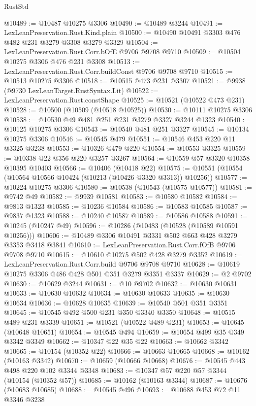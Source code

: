 \begin{lexlean}{RustStd}
\begin{coremodule}
@10489 := @10487 @10275 @3306
@10490 := @10489 @3244
@10491 := LexLeanPreservation.Rust.Kind.plain
@10500 := @10490 @10491 @3303 @476 @482 @231 @3279 @3308 @3279 @3329
@10504 := LexLeanPreservation.Rust.Corr.bOfE @9706 @9708 @9710
@10509 := @10504 @10275 @3306 @476 @231 @3308
@10513 := LexLeanPreservation.Rust.Corr.buildConst @9706 @9708 @9710
@10515 := @10513 @10275 @3306
@10518 := @10515 @473 @231 @3307
@10521 := @9938 (@9730 LexLeanTarget.RustSyntax.Lit)
@10522 := LexLeanPreservation.Rust.constShape
@10525 := @10521 (@10522 @473 @231)
@10528 := @10500 (@10509 (@10518 @10525))
@10530 := @10111 @10275 @3306
@10538 := @10530 @49 @481 @251 @231 @3279 @3327 @3244 @1323
@10540 := @10125 @10275 @3306
@10543 := @10540 @481 @251 @3327
@10545 := @10134 @10275 @3306
@10546 := @10545 @479
@10551 := @10546 @453 @220 @11 @3325 @3238
@10553 := @10326 @479 @220
@10554 := @10553 @3325
@10559 := @10338 @22 @356 @220 @3257 @3267
@10564 := @10559 @57 @3320 @10358 @10395 @10403
@10566 := @10406 (@10418 @22)
@10575 := @10551 (@10554 (@10564 @10566 @10424 (@10213 (@10426 @3320 @3313)) @10256))
@10577 := @10224 @10275 @3306
@10580 := @10538 (@10543 (@10575 @10577))
@10581 := @9742 @49
@10582 := @9939 @10581
@10583 := @10580 @10582
@10584 := @9813 @1323
@10585 := @10236 @10584
@10586 := @10583 @10585
@10587 := @9837 @1323
@10588 := @10240 @10587
@10589 := @10586 @10588
@10591 := @10245 (@10247 @49)
@10596 := @10286 (@10483 (@10528 (@10589 @10591 @10256)))
@10606 := @10489 @3306 @10491 @3331 @502 @663 @428 @3279 @3353 @3418 @3841
@10610 := LexLeanPreservation.Rust.Corr.fOfB @9706 @9708 @9710
@10615 := @10610 @10275 @502 @428 @3279 @3352
@10619 := LexLeanPreservation.Rust.Corr.build @9706 @9708 @9710
@10628 := @10619 @10275 @3306 @486 @428 @501 @351 @3279 @3351 @3337
@10629 := @2 @9702
@10630 := @10629 @3244
@10631 := @10 @9702
@10632 := @10630 @10631
@10633 := @10630 @10632
@10634 := @10630 @10633
@10635 := @10630 @10634
@10636 := @10628 @10635
@10639 := @10540 @501 @351 @3351
@10645 := @10545 @492 @500 @231 @350 @3340 @3350
@10648 := @10515 @489 @231 @3339
@10651 := @10521 (@10522 @489 @231)
@10653 := @10645 (@10648 @10651)
@10654 := @10545 @494
@10659 := @10654 @499 @35 @349 @3342 @3349
@10662 := @10347 @22 @35 @22
@10663 := @10662 @3342
@10665 := @10154 (@10352 @22)
@10666 := @10663 @10665
@10668 := @10162 (@10163 @3342)
@10670 := @10659 (@10666 @10668)
@10676 := @10545 @443 @498 @220 @102 @3344 @3348
@10683 := @10347 @57 @220 @57 @3344 (@10154 (@10352 @57))
@10685 := @10162 (@10163 @3344)
@10687 := @10676 (@10683 @10685)
@10688 := @10545 @496
@10693 := @10688 @453 @72 @11 @3346 @3238

\end{coremodule}
\end{lexlean}
